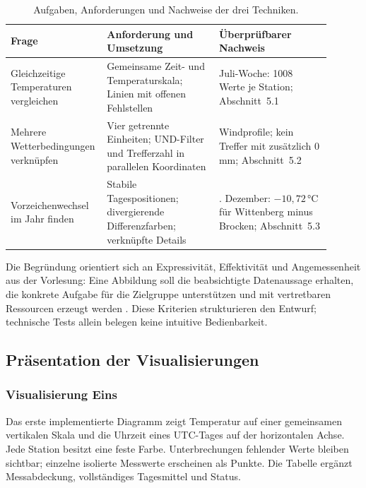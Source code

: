 \documentclass[usegeometry=true]{scrartcl}
\begin{document}
\begin{table}[htbp]
  \centering\small
  \begin{tabular}{>{\raggedright\arraybackslash}p{0.22\linewidth}>{\raggedright\arraybackslash}p{0.34\linewidth}>{\raggedright\arraybackslash}p{0.34\linewidth}}
    Frage & Anforderung und Umsetzung & Überprüfbarer Nachweis \\
    \hline
    Gleichzeitige Temperaturen vergleichen & Gemeinsame Zeit- und Temperaturskala; Linien mit offenen Fehlstellen & Juli-Woche: 1008 Werte je Station; Abschnitt~5.1 \\
    Mehrere Wetterbedingungen verknüpfen & Vier getrennte Einheiten; UND-Filter und Trefferzahl in parallelen Koordinaten & 16 Windprofile; kein Treffer mit zusätzlich 0\,mm; Abschnitt~5.2 \\
    Vorzeichenwechsel im Jahr finden & Stabile Tagespositionen; divergierende Differenzfarben; verknüpfte Details & 28. Dezember: $-10{,}72$\,°C für Wittenberg minus Brocken; Abschnitt~5.3 \\
  \end{tabular}
  \caption{Aufgaben, Anforderungen und Nachweise der drei Techniken.}
  \label{tab:requirements}
\end{table}

Die Begründung orientiert sich an Expressivität, Effektivität und
Angemessenheit aus der Vorlesung: Eine Abbildung soll die beabsichtigte
Datenaussage erhalten, die konkrete Aufgabe für die Zielgruppe unterstützen
und mit vertretbaren Ressourcen erzeugt werden
\autocite[Folien~18--22]{hinneburg2020infovis}. Diese Kriterien strukturieren
den Entwurf; technische Tests allein belegen keine intuitive Bedienbarkeit.
\subsection{Präsentation der Visualisierungen}
\subsubsection{Visualisierung Eins}
Das erste implementierte Diagramm zeigt Temperatur auf einer gemeinsamen
vertikalen Skala und die Uhrzeit eines UTC-Tages auf der horizontalen Achse.
Jede Station besitzt eine feste Farbe. Unterbrechungen fehlender Werte
bleiben sichtbar; einzelne isolierte Messwerte erscheinen als Punkte.
Die Tabelle ergänzt Messabdeckung, vollständiges Tagesmittel und Status.
\end{document}

